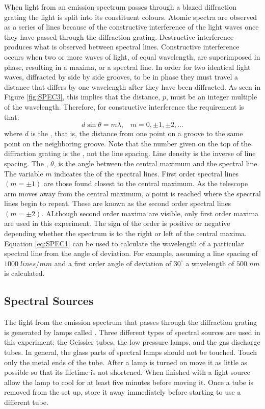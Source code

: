 \documentclass[12pt, a4paper, oneside, openright, titlepage]{book}
\begin{document}
When light from an emission spectrum passes through a blazed diffraction grating the light is split into its constituent colours. Atomic spectra are observed as a series of lines because of the constructive interference of the light waves once they have passed through the diffraction grating. Destructive interference produces what is observed between spectral lines. Constructive interference occurs when two or more waves of light, of equal wavelength, are superimposed in phase, resulting in a maxima, or a spectral line. In order for two identical light waves, diffracted by side by side grooves, to be in phase they must travel a distance that differs by one wavelength after they have been diffracted. As seen in Figure \ref{fig:SPEC3}, this implies that the distance, $p$, must be an integer multiple of the wavelength. Therefore, for constructive interference the requirement is that: \begin{equation}\label{eq:SPEC1}
    d\sin\theta = m\lambda, \;\;\;m = 0,\pm 1,\pm 2,...
\end{equation}
where $d$ is the , that is, the distance from one point on a groove to the same point on the neighboring groove. Note that the number given on the top of the diffraction grating is the , not the line spacing. Line density is the inverse of line spacing. The , $\theta$, is the angle between the central maximum and the spectral line. The variable $m$ indicates the  of the spectral lines. First order spectral lines $(m = \pm 1)$ are those found closest to the central maximum. As the telescope arm moves away from the central maximum, a point is reached where the spectral lines begin to repeat. These are known as the second order spectral lines $(m = \pm 2)$. ALthough second order maxima are visible, only first order maxima are used in this experiment. The sign of the order is positive or negative depending whether the spectrum is to the right or left of the central maxima. Equation \ref{eq:SPEC1} can be used to calculate the wavelength of a particular spectral line from the angle of deviation. For example, assuming a line spacing of $1000\;lines/mm$ and a first order angle of deviation of $30^{\circ}$ a wavelength of $500\;nm$ is calculated.

\subsection{Spectral Sources}

The light from the emission spectrum that passes through the diffraction grating is generated by lamps called . Three different types of spectral sources are used in this experiment: the Geissler tubes, the low pressure lamps, and the gas discharge tubes. In general, the glass parts of spectral lamps should not be touched. Touch only the metal ends of the tube. After a lamp is turned on move it as little as possible so that its lifetime is not shortened. When finished with a light source allow the lamp to cool for at least five minutes before moving it. Once a tube is removed from the set up, store it away immediately before starting to use a different tube.
\end{document}
